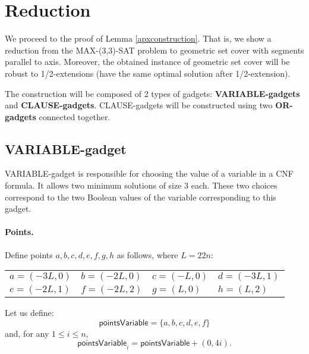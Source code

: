 \section{Reduction}
\label{construction_description}
We proceed to the proof of Lemma \ref{apxconstruction}.
That is, we show a reduction from the MAX-(3,3)-SAT problem
to geometric set cover with segments
parallel to axis. Moreover, the obtained instance
of geometric set cover will be robust
to 1/2-extensions (have the same optimal solution
after 1/2-extension).

The construction will be composed of 2 types of gadgets:
\textbf{VARIABLE-gadgets} and \textbf{CLAUSE-gadgets}.
CLAUSE-gadgets will be constructed using two \textbf{OR-gadgets}
connected together.

\subsection{VARIABLE-gadget}

VARIABLE-gadget is responsible for choosing the value of a variable
in a CNF formula. It allows two minimum solutions of size 3 each.
These two choices correspond to the two Boolean values of the variable
corresponding to this gadget.

\paragraph{Points.}

Define points $a,b,c,d,e,f,g,h$ as follows, where $L = 22n$:


\newcommand{\pointsVarNoArg}{\mathsf{pointsVariable} }
\newcommand{\pointsVar}[1]{\mathsf{pointsVariable}_{#1} }
\newcommand{\chooseVar}[2]{\mathsf{chooseVariable}^{#1}_{#2} }
\newcommand{\segmentsVar}[1]{\mathsf{segmentsVariable}_{#1} }



\begin{center}
\begin{tabular}{ l l l l}
	$a = (-3L, 0)$ &
	$b = (-2L, 0)$ & 
	$c = (-L, 0)$ & 
	$d = (-3L, 1)$ \\  
	$e = (-2L, 1)$ & 
	$f = (-2L, 2)$ &
	$g = (L, 0)$ &
	$h = (L, 2)$
\end{tabular}
\end{center}


Let us define:
$$\pointsVarNoArg =  \{a, b, c, d, e, f\}$$
and, for any $1 \le i \le n$,
$$\pointsVar{i} = \pointsVarNoArg + (0, 4i).$$


